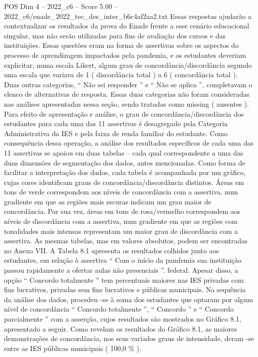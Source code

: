 \begin{textsample}{POS Dim 4 – 2022\_c6 – Score 5.00 – 2022\_c6/enade\_2022\_tec\_des\_inter\_b6c4af2aa2.txt}
Essas respostas ajudarão a contextualizar os resultados da prova do Enade frente a esse cenário educacional singular, mas não serão utilizadas para fins de avaliação dos cursos e das instituições.
Essas questões eram na forma de assertivas sobre os aspectos do processo de aprendizagem impactados pela pandemia, e os estudantes deveriam explicitar, numa escala Likert, algum grau de concordância/discordância segundo uma escala que variava de 1 ( discordância total ) a 6 ( concordância total ).
Duas outras categorias, “ Não sei responder ” e “ Não se aplica ”, completavam o elenco de alternativas de resposta.
Essas duas categorias não foram consideradas nas análises apresentadas nessa seção, sendo tratadas como missing ( ausentes ).
Para efeito de apresentação e análise, o grau de concordância/discordância dos estudantes para cada uma das 11 assertivas é desagregado pela Categoria Administrativa da IES e pela faixa de renda familiar do estudante.
Como consequência dessa operação, a análise dos resultados específicos de cada uma das 11 assertivas se apoiou em duas tabelas – cada qual correspondente a uma das duas dimensões de segmentação dos dados, antes mencionadas.
Como forma de facilitar a interpretação dos dados, cada tabela é acompanhada por um gráfico, cujas cores identificam graus de concordância/discordância distintos.
Áreas em tons de verde correspondem aos níveis de concordância com a assertiva, num gradiente em que as regiões mais escuras indicam um grau maior de concordância.
Por sua vez, áreas em tons de rosa/vermelho correspondem aos níveis de discordância com a assertiva, num gradiente em que as regiões com tonalidades mais intensas representam um maior grau de discordância com a assertiva.
As mesmas tabelas, mas em valores absolutos, podem ser encontradas no Anexo VII.
A Tabela 8.1 apresenta os resultados colhidos junto aos estudantes, em relação à assertiva “ Com o início da pandemia sua instituição passou rapidamente a ofertar aulas não presenciais ”. federal.
Apesar disso, a opção “ Concordo totalmente ” tem percentuais maiores nas IES privadas com fins lucrativos, privadas sem fins lucrativos e públicas municipais.
Na sequência da análise dos dados, procedeu -se à soma dos estudantes que optaram por algum nível de concordância “ Concordo totalmente ”, “ Concordo ” e “ Concordo parcialmente ” com a asserção, cujos resultados são mostrados no Gráfico 8.1, apresentado a seguir.
Como revelam os resultados do Gráfico 8.1, as maiores demonstrações de concordância, nos seus variados graus de intensidade, deram -se entre as IES públicas municipais ( 100,0 \% ).

\end{textsample}
